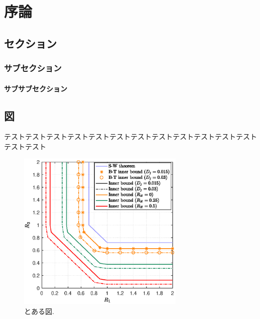 
\chapter{序論}

\section{セクション}\label{sec:example}
\subsection{サブセクション}
\subsubsection{サブサブセクション}





\section{図}

テストテストテストテストテストテストテストテストテストテストテストテストテストテスト
\begin{figure}[ht]
\centering 
\includegraphics[width=8cm]{Figures/epsFigure.eps}
\caption{とある図.}
\label{fig:example}
\end{figure}

